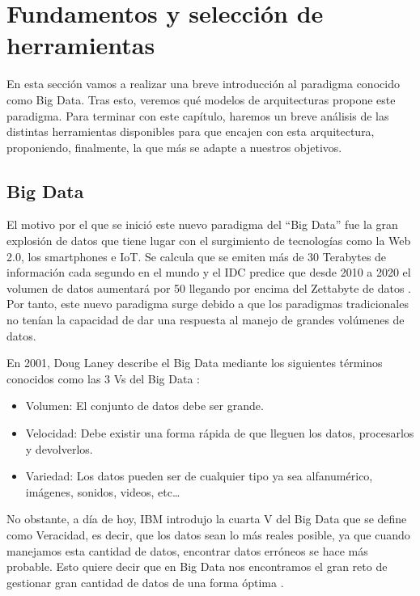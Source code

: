\chapter{Fundamentos y selección de herramientas\label{FunAndTools}}
En esta sección vamos a realizar una breve introducción al
paradigma conocido como Big Data. Tras esto, veremos qué
modelos de arquitecturas propone este paradigma. Para
terminar con este capítulo, haremos un breve análisis de
las distintas herramientas disponibles para que encajen con
esta arquitectura, proponiendo, finalmente, la que más se
adapte a nuestros objetivos.

\section{Big Data\label{WhatIsBigD}}

El motivo por el que se inició este nuevo paradigma del “Big Data” fue
la gran explosión de datos que tiene lugar con el surgimiento
de tecnologías como la Web 2.0, los smartphones e IoT. Se calcula que
se emiten más de 30 Terabytes de información cada segundo en el mundo
\cite{BD-2} y el IDC predice que desde 2010 a 2020 el volumen de datos
aumentará por 50 llegando por encima del Zettabyte de datos
\cite{BD-2}. Por tanto, este nuevo paradigma surge debido a que los
paradigmas tradicionales no tenían la capacidad de dar una respuesta
al manejo de grandes volúmenes de datos.

En 2001, Doug Laney describe el Big Data mediante los siguientes términos
conocidos como las 3 Vs del Big Data \cite{BD-4}:

\begin{itemize}
\item Volumen: El conjunto de datos debe ser grande.
\item Velocidad: Debe existir una forma rápida de que lleguen los datos,
  procesarlos y devolverlos.
\item Variedad: Los datos pueden ser de cualquier tipo ya sea alfanumérico,
  imágenes, sonidos, videos, etc…
\end{itemize}

No obstante, a día de hoy, IBM introdujo la cuarta V del Big Data que se
define como Veracidad, es decir, que los datos sean lo más reales posible,
ya que cuando manejamos esta cantidad de datos, encontrar datos erróneos se
hace más probable. Esto quiere decir que en Big Data nos encontramos el
gran reto de gestionar gran cantidad de datos de una forma óptima
\cite{BD-5}.


